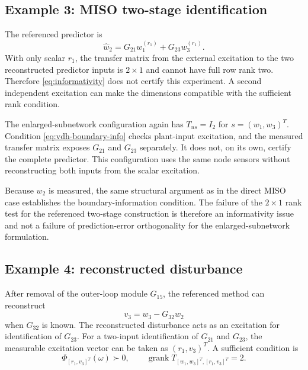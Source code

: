 \documentclass[11pt,a4paper]{article}
\newcommand{\grank}{\operatorname{grank}}
\newcommand{\specmat}[1]{\Phi_{#1}}
\begin{document}
\subsection{Example 3: MISO two-stage identification}

The referenced predictor is
\begin{equation}
  \widehat w_2
  =G_{21}w_1^{(r_1)}+G_{23}w_3^{(r_1)}.
  \label{eq:vdh-twostage-miso}
\end{equation}
With only scalar $r_1$, the transfer matrix from the external excitation to the two reconstructed predictor inputs is $2\times1$ and cannot have full row rank two.  Therefore \eqref{eq:informativity} does not certify this experiment.  A second independent excitation can make the dimensions compatible with the sufficient rank condition.

The enlarged-subnetwork configuration again has $T_{us}=I_2$ for $s=(w_1,w_3)^T$.  Condition \eqref{eq:vdh-boundary-info} checks plant-input excitation, and the measured transfer matrix exposes $G_{21}$ and $G_{23}$ separately.  It does not, on its own, certify the complete predictor.  This configuration uses the same node sensors without reconstructing both inputs from the scalar excitation.

Because $w_2$ is measured, the same structural argument as in the direct MISO case establishes the boundary-information condition.  The failure of the $2\times1$ rank test for the referenced two-stage construction is therefore an informativity issue and not a failure of prediction-error orthogonality for the enlarged-subnetwork formulation.

\subsection{Example 4: reconstructed disturbance}

After removal of the outer-loop module $G_{15}$, the referenced method can reconstruct
\begin{equation}
  v_3=w_3-G_{32}w_2
  \label{eq:reconstructed-v3}
\end{equation}
when $G_{32}$ is known.  The reconstructed disturbance acts as an excitation for identification of $G_{23}$.  For a two-input identification of $G_{21}$ and $G_{23}$, the measurable excitation vector can be taken as $(r_1,v_3)^T$.  A sufficient condition is
\begin{equation}
  \specmat{[r_1,v_3]^T}(\omega)\succ0,
  \qquad
  \grank T_{[w_1,w_3]^T,[r_1,v_3]^T}=2.
  \label{eq:vdh-v3-info}
\end{equation}
\end{document}
